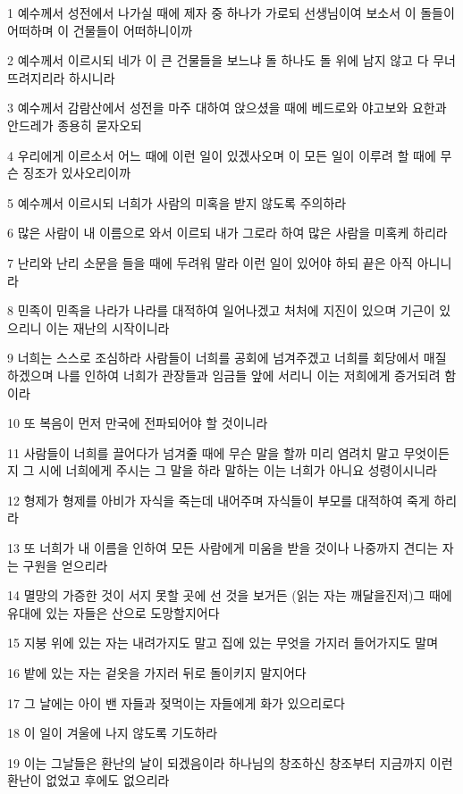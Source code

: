 \par 1 예수께서 성전에서 나가실 때에 제자 중 하나가 가로되 선생님이여 보소서 이 돌들이 어떠하며 이 건물들이 어떠하니이까
\par 2 예수께서 이르시되 네가 이 큰 건물들을 보느냐 돌 하나도 돌 위에 남지 않고 다 무너뜨려지리라 하시니라
\par 3 예수께서 감람산에서 성전을 마주 대하여 앉으셨을 때에 베드로와 야고보와 요한과 안드레가 종용히 묻자오되
\par 4 우리에게 이르소서 어느 때에 이런 일이 있겠사오며 이 모든 일이 이루려 할 때에 무슨 징조가 있사오리이까
\par 5 예수께서 이르시되 너희가 사람의 미혹을 받지 않도록 주의하라
\par 6 많은 사람이 내 이름으로 와서 이르되 내가 그로라 하여 많은 사람을 미혹케 하리라
\par 7 난리와 난리 소문을 들을 때에 두려워 말라 이런 일이 있어야 하되 끝은 아직 아니니라
\par 8 민족이 민족을 나라가 나라를 대적하여 일어나겠고 처처에 지진이 있으며 기근이 있으리니 이는 재난의 시작이니라
\par 9 너희는 스스로 조심하라 사람들이 너희를 공회에 넘겨주겠고 너희를 회당에서 매질하겠으며 나를 인하여 너희가 관장들과 임금들 앞에 서리니 이는 저희에게 증거되려 함이라
\par 10 또 복음이 먼저 만국에 전파되어야 할 것이니라
\par 11 사람들이 너희를 끌어다가 넘겨줄 때에 무슨 말을 할까 미리 염려치 말고 무엇이든지 그 시에 너희에게 주시는 그 말을 하라 말하는 이는 너희가 아니요 성령이시니라
\par 12 형제가 형제를 아비가 자식을 죽는데 내어주며 자식들이 부모를 대적하여 죽게 하리라
\par 13 또 너희가 내 이름을 인하여 모든 사람에게 미움을 받을 것이나 나중까지 견디는 자는 구원을 얻으리라
\par 14 멸망의 가증한 것이 서지 못할 곳에 선 것을 보거든 (읽는 자는 깨달을진저)그 때에 유대에 있는 자들은 산으로 도망할지어다
\par 15 지붕 위에 있는 자는 내려가지도 말고 집에 있는 무엇을 가지러 들어가지도 말며
\par 16 밭에 있는 자는 겉옷을 가지러 뒤로 돌이키지 말지어다
\par 17 그 날에는 아이 밴 자들과 젖먹이는 자들에게 화가 있으리로다
\par 18 이 일이 겨울에 나지 않도록 기도하라
\par 19 이는 그날들은 환난의 날이 되겠음이라 하나님의 창조하신 창조부터 지금까지 이런 환난이 없었고 후에도 없으리라

